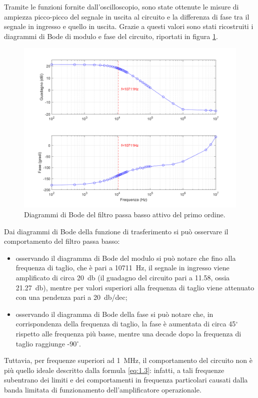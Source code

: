 \newpage
\noindent
Tramite le funzioni fornite dall'oscilloscopio, sono state ottenute le misure di ampiezza picco-picco del segnale in uscita al circuito e la differenza di fase tra il segnale in ingresso e quello in uscita. Grazie a questi valori sono stati ricostruiti i diagrammi di Bode di modulo e fase del circuito, riportati in figura \ref{fig:diagrammi_di_Bode}.
\begin{figure}[h!]
	\centering
	\includegraphics[width=0.80\linewidth]{./ImageFiles/Laboratorio 1/Diagrammi di Bode.png}
	\caption{Diagrammi di Bode del filtro passa basso attivo del primo ordine.}
	\label{fig:diagrammi_di_Bode}
\end{figure}
Dai diagrammi di Bode della funzione di trasferimento si può osservare il comportamento del filtro passa basso:
\begin{itemize}
	\item osservando il diagramma di Bode del modulo si può notare che fino alla frequenza di taglio, che è pari a \SI{10711}{\hertz}, il segnale in ingresso viene amplificato di circa \SI{20}{\decibel} (il guadagno del circuito pari a 11.58, ossia \SI{21.27}{\decibel}), mentre per valori superiori alla frequenza di taglio viene attenuato con una pendenza pari a \SI{20}{\decibel}/dec;
	\item osservando il diagramma di Bode della fase si può notare che, in corrispondenza della frequenza di taglio, la fase è aumentata di circa 45$^{\circ}$rispetto alle frequenza più basse, mentre una decade dopo la frequenza di taglio raggiunge  -90$^{\circ}$.
\end{itemize}

\noindent
Tuttavia, per frequenze superiori ad \SI{1}{\mega\hertz}, il comportamento del circuito non è più quello ideale descritto dalla formula \ref{eq:1.3}: infatti, a tali frequenze subentrano dei limiti e dei comportamenti in frequenza particolari causati dalla banda limitata di funzionamento dell'amplificatore operazionale.


